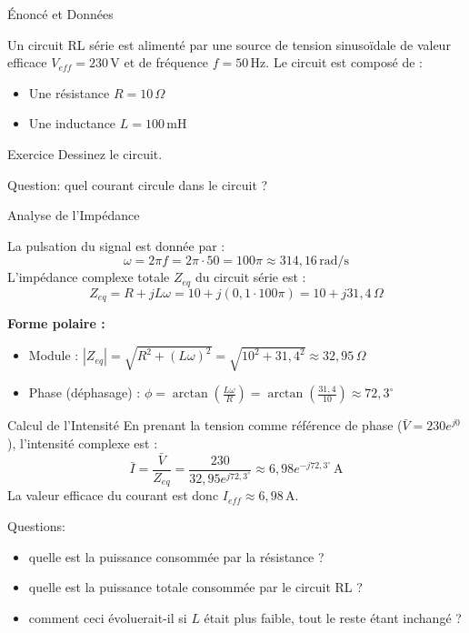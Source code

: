 \begin{frame}{Énoncé et Données}

Un circuit RL série est alimenté par une source de tension sinusoïdale de valeur efficace $V_{eff} = 230 \, \text{V}$ et de fréquence $f = 50 \, \text{Hz}$. Le circuit est composé de :
\begin{itemize}
    \item Une résistance $R = 10 \, \Omega$
    \item Une inductance $L = 100 \, \text{mH}$
\end{itemize}

\begin{block}{Exercice}
Dessinez le circuit. 
\end{block}

\alert{Question: quel courant circule dans le circuit ?}
\end{frame}

\begin{frame}{Analyse de l'Impédance}

La pulsation du signal est donnée par :
\[ \omega = 2\pi f = 2\pi \cdot 50 = 100\pi \approx 314,16 \, \text{rad/s} \]
L'impédance complexe totale $Z_{eq}$ du circuit série est :
\[ Z_{eq} = R + jL\omega = 10 + j(0,1 \cdot 100\pi) = 10 + j31,4 \, \Omega \]


\textbf{Forme polaire :}
\begin{itemize}
    \item Module : $|Z_{eq}| = \sqrt{R^2 + (L\omega)^2} = \sqrt{10^2 + 31,4^2} \approx 32,95 \, \Omega$
    \item Phase (déphasage) : $\phi = \arctan\left(\frac{L\omega}{R}\right) = \arctan\left(\frac{31,4}{10}\right) \approx 72,3^\circ$
\end{itemize}
\end{frame}

\begin{frame}{Calcul de l'Intensité}
En prenant la tension comme référence de phase ($\bar{V} = 230e^{j0}$), l'intensité complexe est :
\[ \bar{I} = \frac{\bar{V}}{Z_{eq}} = \frac{230}{32,95e^{j72,3^\circ}} \approx 6,98 e^{-j72,3^\circ} \, \text{A} \]
La valeur efficace du courant est donc $I_{eff} \approx 6,98 \, \text{A}$.

\begin{block}{Questions:}
\begin{itemize}
	\item quelle est la puissance consommée par la résistance ?
	\item quelle est la puissance totale consommée par le circuit RL ?
	 \item comment ceci évoluerait-il si $L$ était plus faible, tout le reste étant inchangé ? 
\end{itemize}	
\end{block}



\end{frame}


